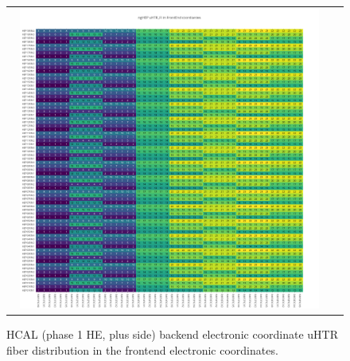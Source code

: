\begin{figure}[htb]
 \begin{center}
  \begin{tabular}{cc}
   \includegraphics[angle=0,width=0.95\textwidth]{figures/appendix/ngHEP_uHTR_FI_in_FrontEnd.png}
  \end{tabular}
  \caption{HCAL (phase 1 HE, plus side) backend electronic coordinate uHTR fiber distribution in the frontend electronic coordinates.}
  \label{fig:lmapngHEPuHTRFIFEC}
 \end{center}
\end{figure}
\clearpage

